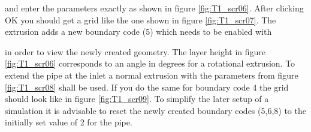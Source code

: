 
and enter the parameters exactly as shown in figure \ref{fig:T1_scr06}. After clicking OK you should get a grid like the one shown in figure \ref{fig:T1_scr07}. The extrusion adds a new boundary code (5) which needs to be enabled with


in order to view the newly created geometry. The layer height in figure \ref{fig:T1_scr06} corresponds to an angle in degrees for a rotational extrusion. To extend the pipe at the inlet a normal extrusion with the parameters from figure \ref{fig:T1_scr08} shall be used. If you do the same for boundary code 4 the grid should look like in figure \ref{fig:T1_scr09}. To simplify the later setup of a simulation it is advisable to reset the newly created boundary codes (5,6,8) to the initially set value of 2 for the pipe.

